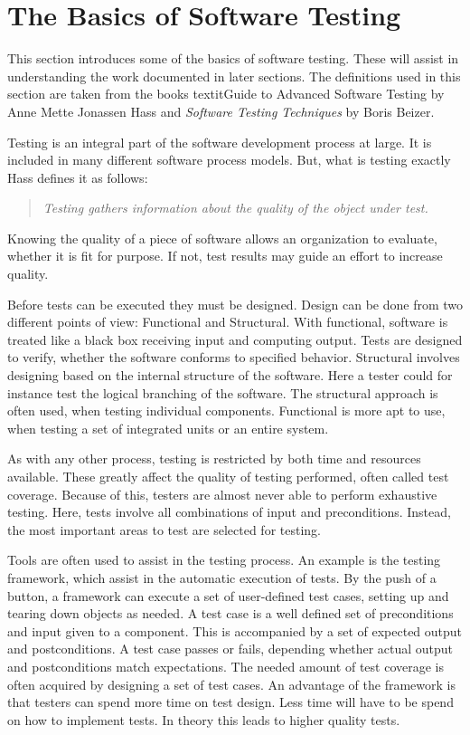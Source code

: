 \section{The Basics of Software Testing}\label{sect:btesting}
This section introduces some of the basics of software testing. These will assist in understanding the work documented in later sections. The definitions used in this section are taken from the books textit{Guide to Advanced Software Testing} by Anne Mette Jonassen Hass\cite{Hass} and \textit{Software Testing Techniques} by Boris Beizer\cite{Beizer}.

Testing is an integral part of the software development process at large. It is included in many different software process models. But, what is testing exactly Hass defines it as follows: 
 \begin{quotation} \textit{Testing gathers information about the quality of the object under test.}\end{quotation}  
Knowing the quality of a piece of software allows an organization to evaluate, whether it is fit for purpose. If not, test results may guide an effort to increase quality.

Before tests can be executed they must be designed.  Design can be done from two different points of view: Functional and Structural. With functional, software is treated like a black box receiving input and computing output. Tests are designed to verify, whether the software conforms to specified behavior. Structural involves designing based on the internal structure of the software. Here a tester could for instance test the logical branching of the software. The structural approach is often used, when testing individual components. Functional is more apt to use, when testing a set of integrated units or an entire system. 

As with any other process, testing is restricted by both time and resources available. These greatly affect the quality of testing performed, often called test coverage. Because of this, testers are almost never able to perform exhaustive testing. Here, tests involve all combinations of input and preconditions. Instead, the most important areas to test are selected for testing.  

Tools are often used to assist in the testing process. An example is the testing framework, which assist in the automatic execution of tests. By the push of a button, a framework can execute a set of user-defined test cases, setting up and tearing down objects as needed. A test case is a well defined set of preconditions and input given to a component. This is  accompanied by a set of expected output and postconditions. A test case passes or fails, depending whether actual output and postconditions match expectations.  The needed amount of test coverage is often acquired by designing a set of test cases. An advantage of the framework is that testers can spend more time on test design. Less time will have to be spend on how to implement tests.  In theory this leads to higher quality tests.

